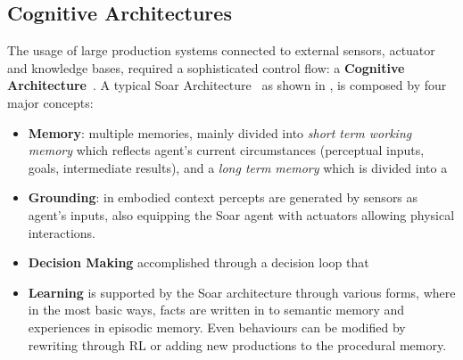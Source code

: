 \subsection{Cognitive Architectures}
The usage of large production systems connected to external sensors, actuator
and knowledge bases, required a sophisticated control flow: a \textbf{Cognitive
Architecture}~\cite{LANGLEY2009141}. A typical Soar
Architecture~\cite{Newell1990-NEWUTO} as shown in , is composed
by four major concepts:
\begin{itemize}
    \item \textbf{Memory}: multiple memories, mainly divided into \emph{short term working memory} which reflects agent's current circumstances (perceptual inputs, goals, intermediate results), and a \emph{long term memory} which is divided into a
    \item \textbf{Grounding}: in embodied context percepts are generated by sensors as agent's inputs, also equipping the Soar agent with actuators allowing physical interactions.
    \item \textbf{Decision Making} accomplished through a decision loop that
    \item \textbf{Learning} is supported by the Soar architecture through various forms, where in the most basic ways, facts are written in to semantic memory and experiences in episodic memory. Even behaviours can be modified by rewriting through \ac{RL} or adding new productions to the procedural memory.
\end{itemize}

